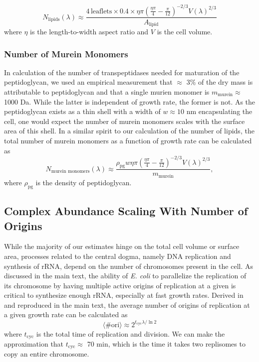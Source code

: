 \begin{equation}
    N_\text{lipids}(\lambda) \approx \frac{4\,\text{leaflets} \times 0.4 \times
    \eta\pi\left(\frac{\eta\pi}{4} -
    \frac{\pi}{12}\right)^{-2/3}V(\lambda)^{2/3}}{A_\text{lipid}}
\end{equation}
where $\eta$ is the length-to-width aspect ratio and $V$ is the cell volume. 

\subsubsection{Number of Murein Monomers}
In calculation of the number of transpeptidases needed for maturation of the
peptidoglycan, we used an empirical measurement that $\approx$ 3\% of the dry
mass is attributable to peptidoglycan and that a single murien monomer is
$m_\text{murein} \approx$ 1000 Da. While the latter is independent of growth rate, the former is
not. As the peptidoglycan exists as a thin shell with a width of $w \approx 10$
nm encapsulating the cell, one would expect the number of murein monomers scales
with the surface area of this shell. In a similar spirit to our calculation of
the number of lipids, the total number of murein monomers as a function of
growth rate can be calculated as 
\begin{equation}
N_\text{murein monomers}(\lambda) \approx \frac{\rho_\text{pg} w \eta\pi\left(\frac{\eta\pi}{4} -
    \frac{\pi}{12}\right)^{-2/3}V(\lambda)^{2/3}}{m_\text{murein}},
\end{equation}
where $\rho_\text{pg}$ is the density of peptidoglycan. 


\subsection{Complex Abundance Scaling With Number of Origins}
While the majority of our estimates hinge on the total cell volume or surface
area, processes related to the central dogma, namely DNA replication and
synthesis of rRNA, depend on the number of chromosomes present in the cell. As
discussed in the main text, the ability of \textit{E. coli} to parallelize the
replication of its chromosome by having multiple active origins of replication
at a given is critical to synthesize enough rRNA, especially at fast growth
rates. Derived in \cite{si2017} and reproduced in the main text, the average number of
origins of replication at a given growth rate can be calculated as 
\begin{equation}
\langle\# \text{ori} \rangle \approx 2^{t_\text{cyc} \lambda / \ln 2}
\label{eq:nori}
\end{equation}
where $t_\text{cyc}$ is the total time of replication and division. We can make
the approximation that $t_\text{cyc} \approx$ 70 min, which is the  time it
takes two replisomes to copy an entire chromosome. 

